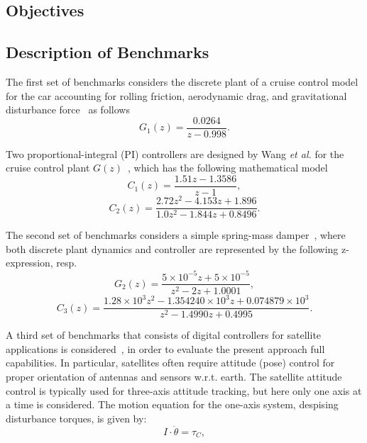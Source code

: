 \documentclass{sig-alternate-05-2015}
\begin{document}
\subsection{Objectives}
\label{experimental-objectives}

\subsection{Description of Benchmarks}
\label{experimental-setup}

The first set of benchmarks considers the discrete plant of a cruise 
control model for the car accounting for rolling friction, aerodynamic drag, 
and gravitational disturbance force~\cite{Astrom08} as follows
%
\begin{equation}
\label{cruise-control-c1}
G_1(z)=\frac{0.0264}{z-0.998}. \nonumber
\end{equation} 

Two proportional-integral (PI) controllers are designed by Wang {\it et al.} 
for the cruise control plant $G(z)$~\cite{DBLP:conf/hybrid/WangGRJF16}, 
which has the following mathematical model
%
\begin{equation}
\label{cruise-control-g1}
C_{1}(z)=\frac{1.51z-1.3586}{z-1}, \nonumber
\end{equation} 
%
\begin{equation}
\label{cruise-control-g2}
C_{2}(z)=\frac{2.72z^2 - 4.153z + 1.896}{1.0z^2 - 1.844z + 0.8496}. \nonumber
\end{equation} 

The second set of benchmarks considers a simple spring-mass 
damper~\cite{DBLP:conf/hybrid/WangGRJF16}, where both discrete 
plant dynamics and controller are represented by the following 
z-expression, resp.
%
\begin{equation}
\label{spring-mass-damper-g}
G_2(z)=\frac{5\times{10^{-5}}z + 5\times{10^{-5}}}{z^2 - 2z + 1.0001}, \nonumber
\end{equation} 
%
\begin{equation}
\label{spring-mass-damper-c}
C_3(z)=\frac{1.28\times{10^{3}}z^2 - 1.354240\times{10^{3}}z + 0.074879\times{10^{3}}}{z^2 - 1.4990z + 0.4995}. \nonumber
\end{equation} 

A third set of benchmarks that consists of digital controllers for satellite applications
is considered~\cite{Franklin15}, in order to evaluate the present approach full capabilities.
In particular, satellites often require attitude (pose) control for proper orientation 
of antennas and sensors w.r.t. earth. The satellite attitude control is typically used 
for three-axis attitude tracking, but here only one axis at a time is considered. 
The motion equation for the one-axis system, despising disturbance torques, is given by:
%
\begin{equation}
\label{eq:satelliteode}
I\cdot \ddot{\theta} = \tau_{C},
\end{equation}
\end{document}

